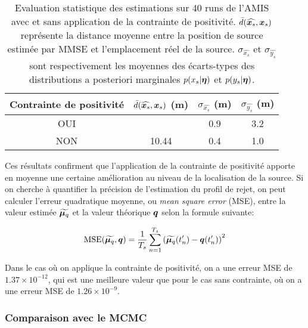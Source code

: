    \begin{table}[h!]
    	\centering
    	
    	\begin{tabular}{cccc}
    		
    		Contrainte de positivité & $\bar{d}(\widehat{{\bm{x}_s}},{\bm{x}_s})$ (m)& $\sigma_{\widehat{x_s}}$ (m)& $\sigma_{\widehat{y_s}}$ (m)\\
    		\hline
    		OUI                   & \NdFS{$<1$}  	& 0.9        & 3.2        \\
    		NON                   & 10.44   & 0.4        & 1.0 \\      
    		\hline
    	\end{tabular}
    	\caption{Evaluation statistique des estimations sur 40 runs de l'AMIS avec et sans application de la contrainte de positivité. $\bar{d}(\widehat{{\bm{x}_s}},{\bm{x}_s})$ représente la distance moyenne entre la position de source estimée par MMSE et l'emplacement réel de la source. $\sigma_{\widehat{x_s}}$ et $\sigma_{\widehat{y_s}}$ sont respectivement les moyennes des écarts-types des distributions a posteriori marginales $p(x_s | {\bm{\eta}})$ et $p(y_s | {\bm{\eta}})$. }
    	\label{table_1_AE}
    \end{table}
    
    Ces résultats confirment que l'application de la contrainte de positivité apporte en moyenne une certaine amélioration au niveau de la localisation de la source. Si on cherche à quantifier la précision de l'estimation du profil de rejet, on peut calculer l'erreur quadratique moyenne, ou \textit{mean square error} (MSE), entre la valeur estimée ${\widetilde{\bm{\mu}_q}}$ et la valeur théorique ${\bm{q}}$ selon la formule suivante: 
    
    \begin{equation}
    \text{MSE}({\widetilde{\bm{\mu}_q}}, {\bm{q}}) = \dfrac{1}{T_s}\sum\limits_{n=1}^{T_s}\left({\widetilde{\bm{\mu}_q}}(t'_n) - {\bm{q}}(t'_n)\right)^2
    \label{eq_AE_31}
    \end{equation}
    
Dans le cas où on applique la contrainte de positivité, on a une erreur MSE de $1.37\times10^{-12}$, qui est une meilleure valeur que pour le cas sans contrainte, où on a une erreur MSE de $1.26\times10^{-9}$.  \\

\subsubsection{Comparaison avec le MCMC}

